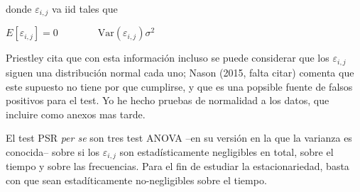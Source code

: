 donde $\varepsilon_{i,j}$ va iid tales que

$
E\left[ \varepsilon_{i,j} \right] = 0
\hspace{4em}
\text{Var}\left( \varepsilon_{i,j} \right) \sigma^{2}
$

Priestley cita que con esta informaci\'on incluso se puede considerar que los $\varepsilon_{i,j}$
siguen una distribuci\'on normal cada uno; Nason (2015, falta citar) comenta que
este supuesto no tiene por que cumplirse, y que es una popsible fuente de falsos positivos
para el test. Yo he hecho pruebas de normalidad a los datos, que incluire como anexos
mas tarde.

El test PSR \textit{per se} son tres test ANOVA --en su versi\'on en la que la varianza es conocida--
sobre si los $\varepsilon_{i,j}$ son estad\'isticamente negligibles en total, sobre el tiempo y sobre
las frecuencias. Para el fin de estudiar la estacionariedad, basta con que sean estad\'iticamente
no-negligibles sobre el tiempo.



